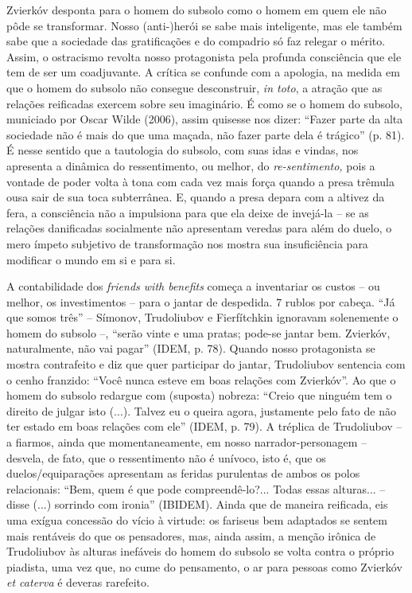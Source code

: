 Zvierkóv desponta para o homem do subsolo como o homem em quem ele não
pôde se transformar. Nosso (anti-)herói se sabe mais inteligente, mas
ele também sabe que a sociedade das gratificações e do compadrio só faz
relegar o mérito. Assim, o ostracismo revolta nosso protagonista pela
profunda consciência que ele tem de ser um coadjuvante. A crítica se
confunde com a apologia, na medida em que o homem do subsolo não
consegue desconstruir, \emph{in toto}, a atração que as relações
reificadas exercem sobre seu imaginário. É como se o homem do subsolo,
municiado por Oscar Wilde (2006), assim quisesse nos dizer: ``Fazer
parte da alta sociedade não é mais do que uma maçada, não fazer parte
dela é trágico'' (p. 81). É nesse sentido que a tautologia do subsolo,
com suas idas e vindas, nos apresenta a dinâmica do ressentimento, ou
melhor, do \emph{re-sentimento,} pois a vontade de poder volta à tona
com cada vez mais força quando a presa trêmula ousa sair de sua toca
subterrânea. E, quando a presa depara com a altivez da fera, a
consciência não a impulsiona para que ela deixe de invejá-la -- se as
relações danificadas socialmente não apresentam veredas para além do
duelo, o mero ímpeto subjetivo de transformação nos mostra sua
insuficiência para modificar o mundo em si e para si.

A contabilidade dos \emph{friends with benefits} começa a inventariar os
custos -- ou melhor, os investimentos -- para o jantar de despedida. 7
rublos por cabeça. ``Já que somos três'' -- Símonov, Trudoliubov e
Fierfítchkin ignoravam solenemente o homem do subsolo --, ``serão vinte
e uma pratas; pode-se jantar bem. Zvierkóv, naturalmente, não vai
pagar'' (IDEM, p. 78). Quando nosso protagonista se mostra contrafeito e
diz que quer participar do jantar, Trudoliubov sentencia com o cenho
franzido: ``Você nunca esteve em boas relações com Zvierkóv''. Ao que o
homem do subsolo redargue com (suposta) nobreza: ``Creio que ninguém tem
o direito de julgar isto (...). Talvez eu o queira agora, justamente
pelo fato de não ter estado em boas relações com ele'' (IDEM, p. 79). A
tréplica de Trudoliubov -- a fiarmos, ainda que momentaneamente, em
nosso narrador-personagem -- desvela, de fato, que o ressentimento não é
unívoco, isto é, que os duelos/equiparações apresentam as feridas
purulentas de ambos os polos relacionais: ``Bem, quem é que pode
compreendê-lo?... Todas essas alturas... -- disse (...) sorrindo com
ironia'' (IBIDEM). Ainda que de maneira reificada, eis uma exígua
concessão do vício à virtude: os fariseus bem adaptados se sentem mais
rentáveis do que os pensadores, mas, ainda assim, a menção irônica de
Trudoliubov às alturas inefáveis do homem do subsolo se volta contra o
próprio piadista, uma vez que, no cume do pensamento, o ar para pessoas
como Zvierkóv \emph{et caterva} é deveras rarefeito.


